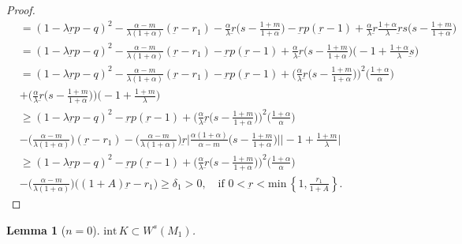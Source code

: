 \documentclass[a4paper,11pt]{article}
\newtheorem{lemma}{Lemma}[section]
\begin{document}
{\begin{proof}
\begin{align}
  &= (1-\lambda \underbar{r}p -q)^2 - \frac{\alpha-m}{\lambda(1+\alpha)}(\underbar{r}-r_1) -\frac{\alpha}{\lambda}\underbar{r}\big(s- \frac{1+m}{1+\alpha}\big) -\underbar{r}p(\underbar{r}-1)+ \frac{\alpha}{\lambda}\underbar{r}\frac{1+\alpha}{\lambda}\underbar{r}s\big(s- \frac{1+m}{1+\alpha}\big)\nonumber\\
  &= (1-\lambda \underbar{r}p -q)^2 - \frac{\alpha-m}{\lambda(1+\alpha)}(\underbar{r}-r_1) -\underbar{r}p(\underbar{r}-1) + \frac{\alpha}{\lambda}\underbar{r}\big(s- \frac{1+m}{1+\alpha}\big)\Big(-1+\frac{1+\alpha}{\lambda}\underbar{s}\Big)\nonumber\\
  &= (1-\lambda \underbar{r}p -q)^2 - \frac{\alpha-m}{\lambda(1+\alpha)}(\underbar{r}-r_1) -\underbar{r}p(\underbar{r}-1) + \Big(\frac{\alpha}{\lambda}\underbar{r}\big(s- \frac{1+m}{1+\alpha}\big)\Big)^2\Big(\frac{1+\alpha}{\alpha}\Big) \nonumber\\
  &+ \Big(\frac{\alpha}{\lambda}\underbar{r}\big(s- \frac{1+m}{1+\alpha}\big)\Big)\Big(-1+ \frac{1+m}{\lambda}\Big)\nonumber\\
  &\ge (1-\lambda \underbar{r}p -q)^2 -\underbar{r}p(\underbar{r}-1) + \Big(\frac{\alpha}{\lambda}\underbar{r}\big(s- \frac{1+m}{1+\alpha}\big)\Big)^2\Big(\frac{1+\alpha}{\alpha}\Big) \nonumber\\
  &- \Big(\frac{\alpha-m}{\lambda(1+\alpha)}\Big)(\underbar{r}-r_1) - \Big(\frac{\alpha-m}{\lambda(1+\alpha)}\Big)\underbar{r}\Big|\frac{\alpha(1+\alpha)}{\alpha-m}\big(s- \frac{1+m}{1+\alpha}\big)\Big|\Big|-1+ \frac{1+m}{\lambda}\Big|\nonumber\\
  &\ge (1-\lambda \underbar{r}p -q)^2  -\underbar{r}p(\underbar{r}-1) + \Big(\frac{\alpha}{\lambda}\underbar{r}\big(s- \frac{1+m}{1+\alpha}\big)\Big)^2\Big(\frac{1+\alpha}{\alpha}\Big) \nonumber\\
  &- \Big(\frac{\alpha-m}{\lambda(1+\alpha)}\Big)\Big((1+A)\underbar{r}-r_1\Big) \ge \delta_1>0, \quad \text{if $0<\underbar{r} < \textrm{min}\,\left\{1, \frac{r_1}{1+A}\right\}$.} \label{eq:affine}
 \end{align}
\end{proof}
\begin{lemma}[$n=0$] \label{l:stable0}
$\textrm{int}\, K \subset W^s(M_1)$.

\end{lemma}}
\end{document}
